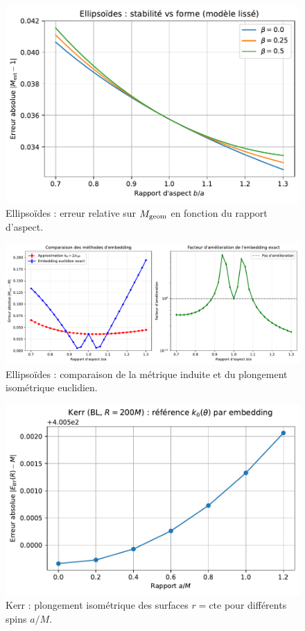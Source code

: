 \documentclass[11pt,a4paper]{article}
\theoremstyle{remark}
\begin{document}
\begin{figure}[htbp]
  \centering
  \includegraphics[width=\linewidth]{fig_relerr_vs_aspect_improved.pdf}
  \caption{Ellipsoïdes : erreur relative sur $M_{\rm geom}$ en fonction du rapport d’aspect.}
  \label{fig:fig_relerr_vs_aspect_improved}
\end{figure}

\begin{figure}[htbp]
  \centering
  \includegraphics[width=\linewidth]{fig_ellipsoids_embedding_comparison.pdf}
  \caption{Ellipsoïdes : comparaison de la métrique induite et du plongement isométrique euclidien.}
  \label{fig:fig_ellipsoids_embedding_comparison}
\end{figure}

\begin{figure}[htbp]
  \centering
  \includegraphics[width=\linewidth]{fig_kerr_embedding_refined.pdf}
  \caption{Kerr : plongement isométrique des surfaces $r=\mathrm{cte}$ pour différents spins $a/M$.}
  \label{fig:fig_kerr_embedding_refined}
\end{figure}
\end{document}
